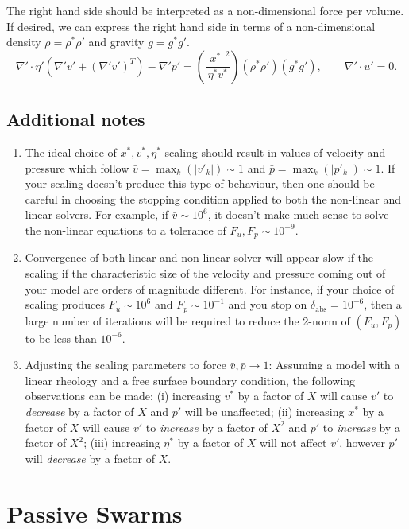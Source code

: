\documentclass[paper=a4, fontsize=11pt,twoside]{scrartcl}
\begin{document}
{{The right hand side should be interpreted as a non-dimensional force per volume. If desired, we can express the right hand side in terms of a non-dimensional density $\rho = \rho^* \rho'$ and gravity $g = g^* g'$.
$$
	\nabla' \cdot \eta' \left( \nabla' v' + (\nabla' v')^T \right) - \nabla' p' 
	= 	\left( \frac{\phantom(x^*\phantom)^2}{\eta^* v^*}  \right) 
		\left( \rho^* \rho' \right)  \left( g^* g' \right),
	\qquad
	\nabla' \cdot u' = 0.
$$

\subsection{Additional notes}
\begin{enumerate}
	\item The ideal choice of $x^*, v^*, \eta^*$ scaling should result in values of velocity and pressure which follow $\bar{v} = \max_k(\vert v'_k \vert) \sim 1$ and $\bar{p} = \max_k(\vert p'_k \vert) \sim 1$. If your scaling doesn't produce this type of behaviour, then one should be careful in choosing the stopping condition applied to both the non-linear and linear solvers. For example, if $\bar{v} \sim 10^6$, it doesn't make much sense to solve the non-linear equations to a tolerance of $F_u, F_p \sim 10^{-9}$.
	\item Convergence of both linear and non-linear solver will appear slow if the scaling if the characteristic size of the velocity and pressure coming out of your model are orders of magnitude different. For instance, if your choice of scaling produces $F_u \sim 10^6$ and $F_p \sim 10^{-1}$ and you stop on $\delta_\text{abs} = 10^{-6}$, then a large number of iterations will be required to reduce the 2-norm of $(F_u, F_p)$ to be less than $10^{-6}$.
	\item Adjusting the scaling parameters to force $\bar{v}, \bar{p} \rightarrow 1$: Assuming a model with a linear rheology and a free surface boundary condition, the following observations can be made: (i) increasing $v^*$ by a factor of $X$ will cause $v'$ to \emph{decrease} by a factor of $X$ and $p'$ will be unaffected; (ii) increasing $x^*$ by a factor of $X$ will cause $v'$ to \emph{increase} by a factor of $X^2$ and $p'$ to \emph{increase} by a factor of $X^2$; (iii) increasing $\eta^*$ by a factor of $X$ will not affect $v'$, however $p'$ will \emph{decrease} by a factor of $X$.
\end{enumerate}

\section{Passive Swarms}
}}
\end{document}
